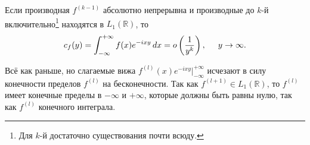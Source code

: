 

\begin{to_lem}
    Если производная $f^{(k-1)}$ абсолютно непрерывна и производные до $k$-й включительно\footnote{
        Для $k$-й достаточно существования почти всюду.
    }  находятся в $L_1 (\mathbb{R})$, то
    \begin{equation*}
        c_f (y) = \int_{-\infty}^{+\infty} f(x) e^{-ixy} \, d x = o \left(\frac{1}{y^k}\right),
        \hspace{5 mm}
        y \to \infty.
    \end{equation*}
    \label{lem8d43}
\end{to_lem}


\begin{uproof}
    Всё как раньше, но слагаемые вижа $f^{(l)} (x) e^{-ixy} |_{-\infty}^{+\infty}$ исчезают в силу конечности пределов $f^{(l)}$ на бесконечности. Так как $f^{(l+1)} \in L_1 (\mathbb{R})$, то $f^{(l)}$ имеет конечные пределы в $-\infty$ и $+\infty$, которые должны быть равны нулю, так как $f^{(l)}$ конечного интеграла.
\end{uproof}
